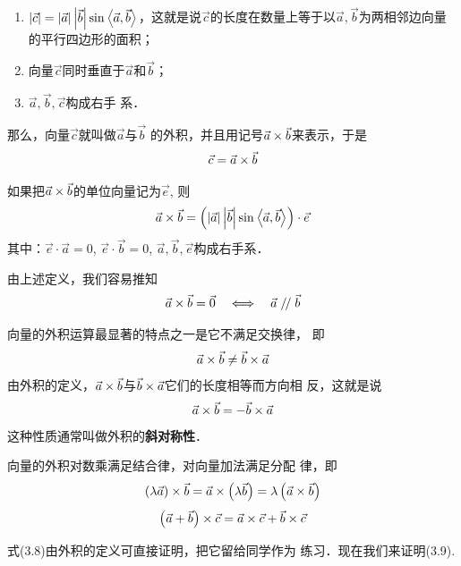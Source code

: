 \begin{enumerate}
    \item $|\vec{c}|=|\vec{a}|\left|\vec{b}\right|\sin\left\langle \vec{a},\vec{b} \right\rangle$，这就是说$\vec{c}$的长度在数量上等于以$\vec{a},\vec{b}$为两相邻边向量的平行四边形的面积；
    \item 向量$\vec{c}$同时垂直于$\vec{a}$和$\vec{b}$；
    \item $\vec{a},\vec{b},\vec{c}$构成右手
    系．
\end{enumerate}

那么，向量$\vec{c}$就叫做$\vec{a}$与$\vec{b}$
的外积，并且用记号$\vec{a}\times\vec{b}$来表示，于是
\[\vec{c}=\vec{a}\times \vec{b}\]

如果把$\vec{a}\times \vec{b}$的单位向量记为$\vec{e}$, 则
\[\vec{a}\times \vec{b}=\left(|\vec{a}|\left|\vec{b}\right|\sin\left\langle \vec{a},\vec{b} \right\rangle\right)\cdot \vec{e}\]
其中：$\vec{e}\cdot \vec{a}=0$, $\vec{e}\cdot \vec{b}=0$, $\vec{a},\vec{b},\vec{e}$构成右手系．

由上述定义，我们容易推知
\[\vec{a}\times \vec{b}=\vec{0}\quad \Longleftrightarrow\quad  \vec{a}\mathrel{/\mskip-2.5mu/} \vec{b}\]

向量的外积运算最显著的特点之一是它不满足交换律，
即
\[\vec{a}\times \vec{b}\ne \vec{b}\times \vec{a}\]
由外积的定义，$\vec{a}\times \vec{b}$与$\vec{b}\times \vec{a}$它们的长度相等而方向相
反，这就是说
\begin{equation}
    \vec{a}\times \vec{b}=-\vec{b}\times \vec{a}
\end{equation}
这种性质通常叫做外积的\textbf{斜对称性}．

向量的外积对数乘满足结合律，对向量加法满足分配
律，即
\begin{equation}
    \left(\lambda\vec{a}\right)\times \vec{b}=\vec{a}\times \left(\lambda\vec{b}\right)=\lambda\left(\vec{a}\times \vec{b}\right)
\end{equation}
\begin{equation}
    \left(\vec{a}+\vec{b}\right)\times \vec{c}=\vec{a}\times \vec{c}+\vec{b}\times \vec{c}
\end{equation}

式(3.8)由外积的定义可直接证明，把它留给同学作为
练习．现在我们来证明(3.9).

